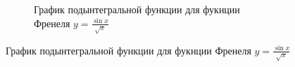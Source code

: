 \documentclass[12pt, a4paper]{article}
\begin{document}
\begin{figure}[H]
\begin{minipage}[t]{.4\textwidth}
\begin{figure}[H]
  \caption{График подынтегральной функции для фукнции Френеля $y =  \frac{\sin{x}}{\sqrt{x}}$}
  \label{fig:fren1_fun}
    \end{figure}
\end{minipage}
\end{figure}
\end{document}
